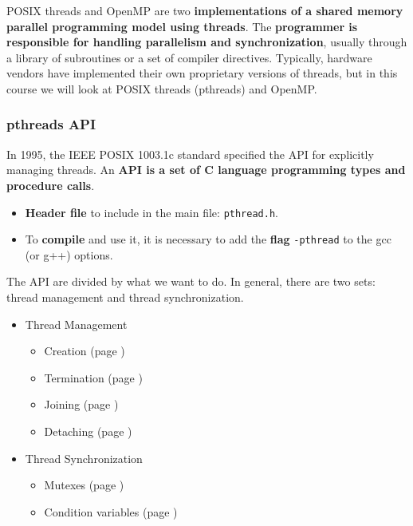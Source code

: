 \noindent
POSIX threads and OpenMP are two \textbf{implementations of a shared memory parallel programming model using threads}. The \textbf{programmer is responsible for handling parallelism and synchronization}, usually through a library of subroutines or a set of compiler directives. Typically, hardware vendors have implemented their own proprietary versions of threads, but in this course we will look at POSIX threads (pthreads) and OpenMP.

\newpage

\subsubsection{pthreads API}

In 1995, the IEEE POSIX 1003.1c standard specified the API for explicitly managing threads. An \textbf{API is a set of C language programming types and procedure calls}.
\begin{itemize}
    \item \textbf{Header file} to include in the main file: \texttt{pthread.h}.
    \item To \textbf{compile} and use it, it is necessary to add the \textbf{flag} \texttt{-pthread} to the gcc (or g++) options.
\end{itemize}
The API are divided by what we want to do. In general, there are two sets: thread management and thread synchronization.
\begin{itemize}
    \item Thread Management
    \begin{itemize}
        \item Creation (page \pageref{paragraph: Creation})
        \item Termination (page \pageref{paragraph: Termination})
        \item Joining (page \pageref{paragraph: Joining})
        \item Detaching (page \pageref{paragraph: Detaching})
    \end{itemize}
    \item Thread Synchronization
    \begin{itemize}
        \item Mutexes (page \pageref{paragraph: Mutexes})
        \item Condition variables (page \pageref{paragraph: Condition variables})
    \end{itemize}
\end{itemize}

